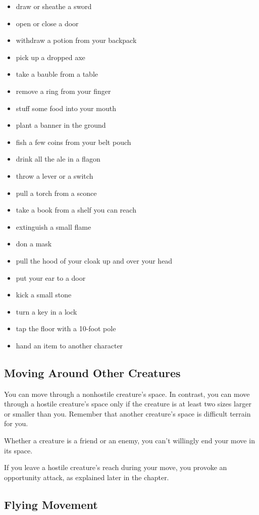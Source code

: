 \begin{itemize}
\item draw or sheathe a sword
\item open or close a door
\item withdraw a potion from your backpack
\item pick up a dropped axe
\item take a bauble from a table
\item remove a ring from your finger
\item stuff some food into your mouth
\item plant a banner in the ground
\item fish a few coins from your belt pouch
\item drink all the ale in a flagon
\item throw a lever or a switch
\item pull a torch from a sconce
\item take a book from a shelf you can reach
\item extinguish a small flame
\item don a mask
\item pull the hood of your cloak up and over your head
\item put your ear to a door
\item kick a small stone
\item turn a key in a lock
\item tap the floor with a 10-foot pole
\item hand an item to another character
\end{itemize}

\subsection{Moving Around Other Creatures}

You can move through a nonhostile creature's space. In contrast, you can move through a hostile creature's space only if the creature is at least two sizes larger or smaller than you. Remember that another creature's space is difficult terrain for you.

Whether a creature is a friend or an enemy, you can't willingly end your move in its space.

If you leave a hostile creature's reach during your move, you provoke an opportunity attack, as explained later in the chapter.

\subsection{Flying Movement}

